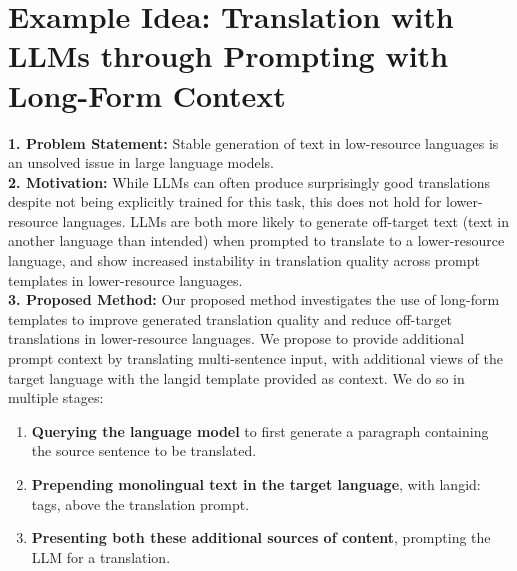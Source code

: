 \newpage 


\section{Example Idea: Translation with LLMs through Prompting with Long-Form Context}
\label{sec:example_3}

\begin{tcolorbox}[colback=blue!5!white,colframe=blue!75!black,title=\textbf{Translation with LLMs through Prompting with Long-Form Context (Part 1)}]
\small 
    \textbf{1. Problem Statement:} Stable generation of text in low-resource languages is an unsolved issue in large language models.
\\

    \textbf{2. Motivation:} While LLMs can often produce surprisingly good translations despite not being explicitly trained for this task, this does not hold for lower-resource languages. LLMs are both more likely to generate off-target text (text in another language than intended) when prompted to translate to a lower-resource language, and show increased instability in translation quality across prompt templates in lower-resource languages.
\\

    \textbf{3. Proposed Method:} Our proposed method investigates the use of long-form templates to improve generated translation quality and reduce off-target translations in lower-resource languages. We propose to provide additional prompt context by translating multi-sentence input, with additional views of the target language with the langid template provided as context. We do so in multiple stages:
    \begin{enumerate}
        \item \textbf{Querying the language model} to first generate a paragraph containing the source sentence to be translated.
        \item \textbf{Prepending monolingual text in the target language}, with {langid:} tags, above the translation prompt.
        \item \textbf{Presenting both these additional sources of content}, prompting the LLM for a translation.
    \end{enumerate}



\end{tcolorbox}
